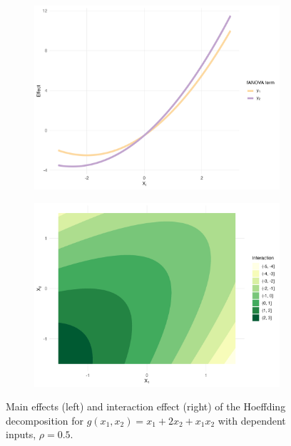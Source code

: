 \begin{figure}[htpb]
    \centering
    \begin{subfigure}[t]{0.49\textwidth}
        \centering
        \includegraphics[width=\textwidth]{images/experiment_section/hoeffding_rho05_main.png}
    \end{subfigure}%
    \hfill
    \begin{subfigure}[t]{0.49\textwidth}
        \centering
        \includegraphics[width=\textwidth]{images/experiment_section/hoeffding_rho05_interaction.png}
    \end{subfigure}
    \caption{Main effects (left) and interaction effect (right) of the Hoeffding decomposition for $g(x_1, x_2) = x_1 + 2 x_2 + x_1 x_2$ with dependent inputs, $\rho = 0.5$.}
    \label{fig:hoeffding_rho05}
\end{figure}
